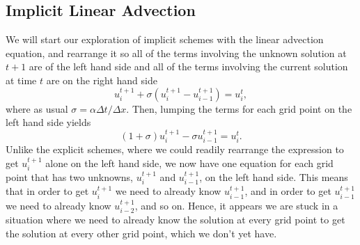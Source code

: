 \subsection{Implicit Linear Advection}
We will start our exploration of implicit schemes with the linear advection equation, and rearrange it so all of the terms involving the unknown solution at $t+1$ are of the left hand side and all of the terms involving the current solution at time $t$ are on the right hand side
\begin{equation}
	u_i^{t+1} + \sigma \left(u_i^{t+1} - u_{i-1}^{t+1} \right) = u_i^{t},
\end{equation}
where as usual $\sigma = \alpha \Delta t/ \Delta x$. Then, lumping the terms for each grid point on the left hand side yields
\begin{equation}
	\label{eqn:sh4k18g9}
	(1+\sigma) u_i^{t+1} - \sigma u_{i-1}^{t+1} = u_i^{t}.
\end{equation}
Unlike the explicit schemes, where we could readily rearrange the expression to get $u_i^{t+1}$ alone on the left hand side, we now have one equation for each grid point that has two unknowns, $u_i^{t+1}$ and $u_{i-1}^{t+1}$, on the left hand side. This means that in order to get $u_i^{t+1}$ we need to already know $u_{i-1}^{t+1}$, and in order to get $u_{i-1}^{t+1}$ we need to already know $u_{i-2}^{t+1}$, and so on. Hence, it appears we are stuck in a situation where we need to already know the solution at every grid point to get the solution at every other grid point, which we don't yet have.

